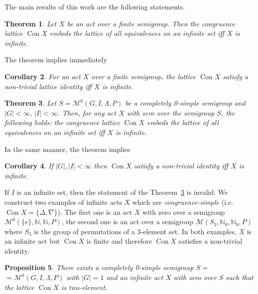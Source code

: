 \documentclass{birkau}
\numberwithin{equation}{section}
\theoremstyle{plain}
\newtheorem{theorem}{Theorem}[section]
\newtheorem{proposition}[theorem]{Proposition}
\newtheorem{corollary}[theorem]{Corollary}
\theoremstyle{definition}
\DeclareMathOperator{\Con}{Con}
\begin{document}
	The main results of this work are the following statements.
	
	\begin{theorem} \label{t01}
	    Let $X$ be an act over a finite semigroup. Then the congruence lattice $\Con X$ embeds the lattice of all equivalences on an infinite set iff $X$ is infinite.
	\end{theorem}
	
	The theorem implies immediately
	
	\begin{corollary}
	    For an act $X$ over a finite semigroup, the lattice $\Con X$ satisfy a non-trivial lattice identity iff $X$ is infinite.
	\end{corollary}
	
	\begin{theorem} \label{t02}
	    Let $S = \mathcal{M}^0(G,I,\Lambda,P)$ be a completely 0-simple semigroup and $|G| < \infty,\, |I| < \infty $. Then, for any act $X$ with zero over the semigroup $S$, the following holds: the congruence lattice $\Con X$ embeds the lattice of all equivalences on an infinite set iff $X$ is infinite.
	\end{theorem}
	
	In the same manner, the theorem implies
	
	\begin{corollary}
	    If $|G|,|I| < \infty$ then $\Con X$ satisfy a non-trivial identity iff $X$ is infinite.
	\end{corollary}
	
	If $I$ is an infinite set, then the statement of the Theorem~\ref{t02} is invalid. We construct two examples of infinite acts $X$ which are \textit{congruence-simple} (i.e. $\Con X = \{ \Delta, \nabla \}$). The first one is an act $X$ with zero over a semigroup $\mathcal{M}^0(\{e\},\mathbb{N},\mathbb{N},P)$, the second one is an act over a semigroup $\mathcal{M}(S_3,\mathbb{N}_0,\mathbb{N}_0,P)$ where $S_3$ is the group of permutations of a 3-element set. In both examples, $X$ is an infinite act but $\Con X$ is finite and therefore $\Con X$ satisfies a non-trivial identity.
	
	\begin{proposition} \label{pr01a}
	    There exists a completely 0-simple semigroup $ S = $ \newline $ = \mathcal{M}^0(G,I,\Lambda,P) $ with $|G| = 1$ and an infinite act $X$ with zero over $S$ such that the lattice $\Con X$ is two-element.
	\end{proposition}
	
\end{document}
